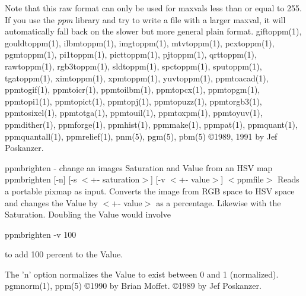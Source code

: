 \par
Note that this raw format can only be used for maxvals less than
or equal to 255.
If you use the
{\it ppm}
library and try to write a file with a larger maxval,
it will automatically fall back on the slower but more general plain
format.
giftoppm(1), gouldtoppm(1), ilbmtoppm(1), imgtoppm(1), mtvtoppm(1),
pcxtoppm(1), pgmtoppm(1), pi1toppm(1), picttoppm(1), pjtoppm(1), qrttoppm(1),
rawtoppm(1), rgb3toppm(1), sldtoppm(1), spctoppm(1), sputoppm(1), tgatoppm(1),
ximtoppm(1), xpmtoppm(1), yuvtoppm(1),
ppmtoacad(1), ppmtogif(1), ppmtoicr(1), ppmtoilbm(1), ppmtopcx(1), ppmtopgm(1),
ppmtopi1(1), ppmtopict(1), ppmtopj(1), ppmtopuzz(1), ppmtorgb3(1),
ppmtosixel(1), ppmtotga(1), ppmtouil(1), ppmtoxpm(1), ppmtoyuv(1),
ppmdither(1), ppmforge(1), ppmhist(1), ppmmake(1), ppmpat(1), ppmquant(1),
ppmquantall(1), ppmrelief(1),
pnm(5), pgm(5), pbm(5)
\copyright 1989, 1991 by Jef Poskanzer.
%
 
%

\newpage
%

ppmbrighten - change an images Saturation and Value from an HSV map
ppmbrighten [-n] [-s $<$+- saturation$>$] [-v $<$+- value$>$] $<$ppmfile$>$
Reads a portable pixmap as input.
Converts the image from RGB space to HSV space and changes
the Value by $<$+- value$>$ as a percentage.
Likewise with the Saturation.
Doubling the Value would involve
\par\vspace{1.0\baselineskip}
ppmbrighten -v 100
\par\vspace{1.0\baselineskip}
to add 100 percent to the Value.
\par
The 'n' option normalizes the Value to exist between 0 and 1
(normalized).
pgmnorm(1), ppm(5)
\copyright 1990 by Brian Moffet.
\copyright 1989 by Jef Poskanzer.

